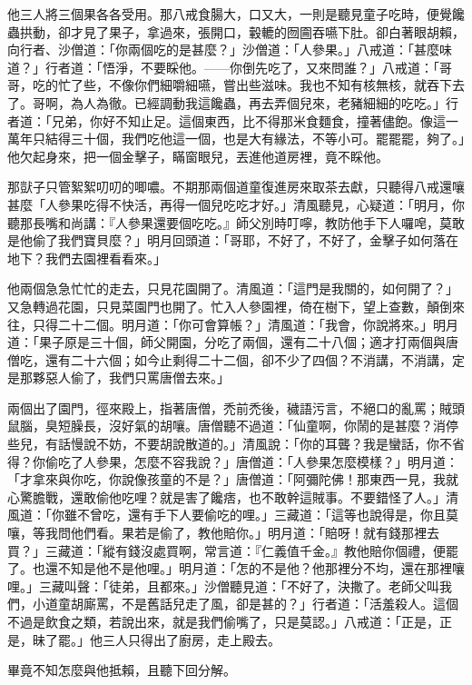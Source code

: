 他三人將三個果各各受用。那八戒食腸大，口又大，一則是聽見童子吃時，便覺饞蟲拱動，卻才見了果子，拿過來，張開口，轂轆的囫圇吞嚥下肚。卻白著眼胡賴，向行者、沙僧道：「你兩個吃的是甚麼？」沙僧道：「人參果。」八戒道：「甚麼味道？」行者道：「悟淨，不要睬他。——你倒先吃了，又來問誰？」八戒道：「哥哥，吃的忙了些，不像你們細嚼細嚥，嘗出些滋味。我也不知有核無核，就吞下去了。哥啊，為人為徹。已經調動我這饞蟲，再去弄個兒來，老豬細細的吃吃。」行者道：「兄弟，你好不知止足。這個東西，比不得那米食麵食，撞著儘飽。像這一萬年只結得三十個，我們吃他這一個，也是大有緣法，不等小可。罷罷罷，夠了。」他欠起身來，把一個金擊子，瞞窗眼兒，丟進他道房裡，竟不睬他。

那獃子只管絮絮叨叨的唧噥。不期那兩個道童復進房來取茶去獻，只聽得八戒還嚷甚麼「人參果吃得不快活，再得一個兒吃吃才好。」清風聽見，心疑道：「明月，你聽那長嘴和尚講：『人參果還要個吃吃。』師父別時叮嚀，教防他手下人囉唣，莫敢是他偷了我們寶貝麼？」明月回頭道：「哥耶，不好了，不好了，金擊子如何落在地下？我們去園裡看看來。」

他兩個急急忙忙的走去，只見花園開了。清風道：「這門是我關的，如何開了？」又急轉過花園，只見菜園門也開了。忙入人參園裡，倚在樹下，望上查數，顛倒來往，只得二十二個。明月道：「你可會算帳？」清風道：「我會，你說將來。」明月道：「果子原是三十個，師父開園，分吃了兩個，還有二十八個；適才打兩個與唐僧吃，還有二十六個；如今止剩得二十二個，卻不少了四個？不消講，不消講，定是那夥惡人偷了，我們只罵唐僧去來。」

兩個出了園門，徑來殿上，指著唐僧，禿前禿後，穢語污言，不絕口的亂罵；賊頭鼠腦，臭短臊長，沒好氣的胡嚷。唐僧聽不過道：「仙童啊，你鬧的是甚麼？消停些兒，有話慢說不妨，不要胡說散道的。」清風說：「你的耳聾？我是蠻話，你不省得？你偷吃了人參果，怎麼不容我說？」唐僧道：「人參果怎麼模樣？」明月道：「才拿來與你吃，你說像孩童的不是？」唐僧道：「阿彌陀佛！那東西一見，我就心驚膽戰，還敢偷他吃哩？就是害了饞痞，也不敢幹這賊事。不要錯怪了人。」清風道：「你雖不曾吃，還有手下人要偷吃的哩。」三藏道：「這等也說得是，你且莫嚷，等我問他們看。果若是偷了，教他賠你。」明月道：「賠呀！就有錢那裡去買？」三藏道：「縱有錢沒處買啊，常言道：『仁義值千金。』教他賠你個禮，便罷了。也還不知是他不是他哩。」明月道：「怎的不是他？他那裡分不均，還在那裡嚷哩。」三藏叫聲：「徒弟，且都來。」沙僧聽見道：「不好了，決撒了。老師父叫我們，小道童胡廝罵，不是舊話兒走了風，卻是甚的？」行者道：「活羞殺人。這個不過是飲食之類，若說出來，就是我們偷嘴了，只是莫認。」八戒道：「正是，正是，昧了罷。」他三人只得出了廚房，走上殿去。

畢竟不知怎麼與他抵賴，且聽下回分解。
